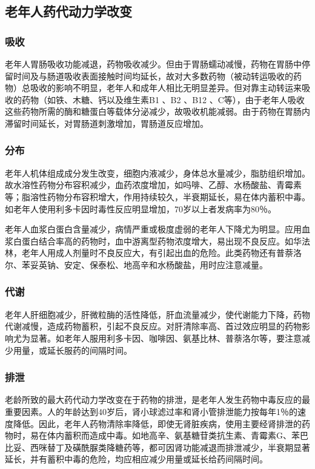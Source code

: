 \subsection{老年人药代动力学改变}

\subsubsection{吸收}

老年人胃肠吸收功能减退，药物吸收减少。但由于胃肠蠕动减慢，药物在胃肠中停留时间及与肠道吸收表面接触时间均延长，故对大多数药物（被动转运吸收的药物）总吸收的影响不明显，老年人和成年人相比无明显差异。但对靠主动转运来吸收的药物（如铁、木糖、钙以及维生素B{1}
、B{2} 、B{12}
、C等），由于老年人吸收这些药物所需的酶和糖蛋白等载体分泌减少，故吸收机能减弱。由于药物在胃肠内滞留时间延长，对胃肠道刺激增加，胃肠道反应增加。

\subsubsection{分布}

老年人机体组成成分发生改变，细胞内液减少，身体总水量减少，脂肪组织增加。故水溶性药物分布容积减少，血药浓度增加，如吗啡、乙醇、水杨酸盐、青霉素等；脂溶性药物分布容积增大，作用持续较久，半衰期延长，易在体内蓄积中毒。如老年人使用利多卡因时毒性反应明显增加，70岁以上者发病率为80％。

老年人血浆白蛋白含量减少，病情严重或极度虚弱的老年人下降尤为明显。应用血浆白蛋白结合率高的药物时，血中游离型药物浓度增大，易出现不良反应。如华法林，老年人用成人剂量时不良反应大，有引起出血的危险。此类药物还有普萘洛尔、苯妥英钠、安定、保泰松、地高辛和水杨酸盐，用时应注意减量。

\subsubsection{代谢}

老年人肝细胞减少，肝微粒酶的活性降低，肝血流量减少，使代谢能力下降，药物代谢减慢，造成药物蓄积，引起不良反应。对肝清除率高、首过效应明显的药物影响尤为显著。如老年人服用利多卡因、咖啡因、氨基比林、普萘洛尔等，要注意减少用量，或延长服药的间隔时间。

\subsubsection{排泄}

老龄所致的最大药代动力学改变在于药物的排泄，是老年人发生药物中毒反应的最重要因素。人的年龄达到40岁后，肾小球滤过率和肾小管排泄能力按每年1％的速度降低。因此，老年人药物清除率降低，即使无肾脏疾病，使用主要经肾排泄的药物时，易在体内蓄积而造成中毒。如地高辛、氨基糖苷类抗生素、青霉素G、苯巴比妥、西咪替丁及磺酰脲类降糖药等，都可因肾功能减退而排泄减少，半衰期显著延长，并有蓄积中毒的危险，均应相应减少用量或延长给药间隔时间。

